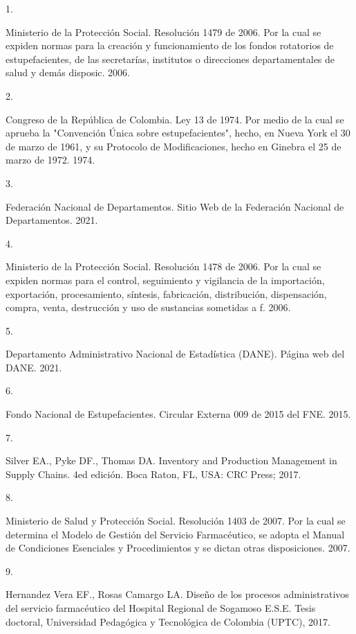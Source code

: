 \documentclass[
]{book}
\newlength{\cslhangindent}
\newlength{\csllabelwidth}
\newlength{\cslentryspacingunit} %
\newenvironment{CSLReferences}[2] %
 {%
  \setlength{\parindent}{0pt}
  \ifodd #1
  \let\oldpar\par
  \def\par{\hangindent=\cslhangindent\oldpar}
  \fi
  \setlength{\parskip}{#2\cslentryspacingunit}
 }%
 {}
\newcommand{\CSLLeftMargin}[1]{\parbox[t]{\csllabelwidth}{#1}}
\newcommand{\CSLRightInline}[1]{\parbox[t]{\linewidth - \csllabelwidth}{#1}\break}
\begin{document}
\hypertarget{refs}{}
\begin{CSLReferences}{0}{0}
\leavevmode{}%
\CSLLeftMargin{1. }
\CSLRightInline{Ministerio de la Protección Social. {Resoluci{ó}n 1479 de 2006. Por la cual se expiden normas para la creaci{ó}n y funcionamiento de los fondos rotatorios de estupefacientes, de las secretar{í}as, institutos o direcciones departamentales de salud y dem{á}s disposic}. 2006.}

\leavevmode{}%
\CSLLeftMargin{2. }
\CSLRightInline{Congreso de la República de Colombia. {Ley 13 de 1974. Por medio de la cual se aprueba la "Convenci{ó}n {Ú}nica sobre estupefacientes", hecho, en Nueva York el 30 de marzo de 1961, y su Protocolo de Modificaciones, hecho en Ginebra el 25 de marzo de 1972}. 1974.}

\leavevmode{}%
\CSLLeftMargin{3. }
\CSLRightInline{Federación Nacional de Departamentos. {Sitio Web de la Federaci{ó}n Nacional de Departamentos}. 2021.}

\leavevmode{}%
\CSLLeftMargin{4. }
\CSLRightInline{Ministerio de la Protección Social. {Resoluci{ó}n 1478 de 2006. Por la cual se expiden normas para el control, seguimiento y vigilancia de la importaci{ó}n, exportaci{ó}n, procesamiento, s{í}ntesis, fabricaci{ó}n, distribuci{ó}n, dispensaci{ó}n, compra, venta, destrucci{ó}n y uso de sustancias sometidas a f}. 2006.}

\leavevmode{}%
\CSLLeftMargin{5. }
\CSLRightInline{Departamento Administrativo Nacional de Estadística (DANE). {P{á}gina web del DANE}. 2021.}

\leavevmode{}%
\CSLLeftMargin{6. }
\CSLRightInline{Fondo Nacional de Estupefacientes. {Circular Externa 009 de 2015 del FNE}. 2015.}

\leavevmode{}%
\CSLLeftMargin{7. }
\CSLRightInline{Silver EA., Pyke DF., Thomas DA. {Inventory and Production Management in Supply Chains}. 4ed edición. Boca Raton, FL, USA: CRC Press; 2017.}

\leavevmode{}%
\CSLLeftMargin{8. }
\CSLRightInline{Ministerio de Salud y Protección Social. {Resoluci{ó}n 1403 de 2007. Por la cual se determina el Modelo de Gesti{ó}n del Servicio Farmac{é}utico, se adopta el Manual de Condiciones Esenciales y Procedimientos y se dictan otras disposiciones}. 2007.}

\leavevmode{}%
\CSLLeftMargin{9. }
\CSLRightInline{Hernandez Vera EF., Rosas Camargo LA. {Dise{ñ}o de los procesos administrativos del servicio farmac{é}utico del Hospital Regional de Sogamoso E.S.E.} Tesis doctoral, Universidad Pedag{ó}gica y Tecnol{ó}gica de Colombia (UPTC), 2017.}

\end{CSLReferences}
\end{document}
